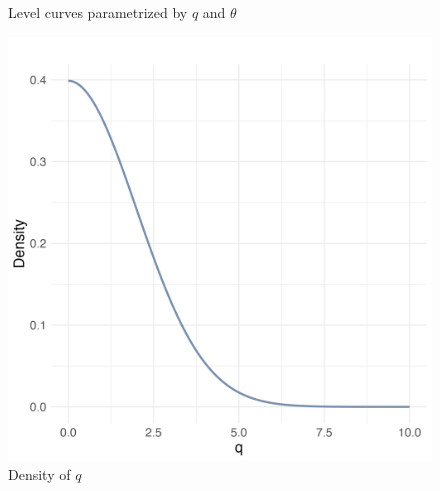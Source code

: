\documentclass{article}
\begin{document}
\begin{figure}[h!]
\begin{minipage}{0.45\textwidth}
        \caption{Level curves parametrized by $q$ and $\theta$}
    \end{minipage}
    \hfill
    \begin{minipage}{0.45\textwidth}
        \centering
        \includegraphics[width=\linewidth]{plots/density_q_ex2.png}
        \caption{Density of $q$}
    \end{minipage}
\end{figure}
\end{document}

